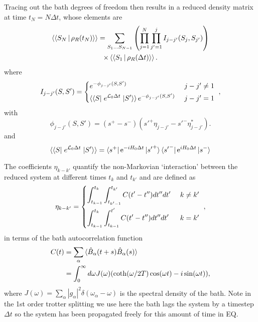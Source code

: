 \documentclass[a4paper, aps, pra,twocolumn]{revtex4-1}
\newcommand{\dket}[1]{\left.\Ket{#1}\right\rangle}
\newcommand{\dbra}[1]{\left\langle\Bra{#1}\right.}
\newcommand{\dbraket}[1]{\left\langle\Braket{#1}\right\rangle}
\begin{document}
Tracing out the bath degrees of freedom then results in a reduced density matrix at time $t_N=N\Delta t$, whose elements are 
\begin{multline}
\label{discreteevo}
\dbraket{S_N|\rho_R(t_N)}=\sum_{S_1 \ldots S_{N-1}}\left(\prod_{j=1}^N \prod_{j'=1}^j I_{j-j'}(S_j,S_{j'})\right)\\
\times \dbraket{S_1 |\rho_R(\Delta t)} .
\end{multline}
where
\begin{equation}
I_{j-j'}(S,S') = \begin{dcases*}
e^{- \phi_{j-j'}(S,S')} &\text{ $j-j'\ne 1$}\\ 
\dbra{S}e^{\mathcal{L}_0 \Delta t}\dket{S'}e^{- \phi_{j-j'}(S,S')} &\text{ $j-j'=1$}
\end{dcases*},
\end{equation}
with
\begin{equation}
 \phi_{j-j'}(S,S')=(s^+-s^-)({s'}^+\eta_{j-j'}-{s'}^-\eta_{j-j'}^*).
\end{equation}
and 
\begin{equation}
\dbra{S}e^{\mathcal{L}_0 \Delta t}\dket{S'}= \bra{s^+}\text{e}^{-iH_0 \Delta t}\ket{{s'}^+}\bra{{s'}^-}\text{e}^{iH_0 \Delta t}\ket{s^-}
\end{equation}


The coefficients $\eta_{k-k'}$ quantify the non-Markovian `interaction' between the reduced system at different times $t_k$ and $t_{k'}$ and are defined as
\begin{equation}
\eta_{k-k'} = \begin{dcases*}
\int_{t_{k-1}}^{t_k}\int_{t_{k'-1}}^{t_{k'}}C(t'-t'')dt''dt' &\text{ $k\ne k'$}\\ 
\int_{t_{k-1}}^{t_k}\int_{t_{k-1}}^{t'}C(t'-t'')dt''dt' &\text{ $k=k'$}
\end{dcases*},
\end{equation}
in terms of the bath autocorrelation function 
\begin{align}\label{bathcorr}
C(t)&=\sum_\alpha \braket{\hat{B}_\alpha(t+s)\hat{B}_\alpha(s)}\\
&=\int_0^\infty d\omega J(\omega)(\coth( \omega/2 T)\cos(\omega t)-i \sin(\omega t)),
\end{align}
where $J(\omega)=\sum_\alpha |g_\alpha|^2 \delta(\omega_\alpha-\omega)$ is the spectral density of the bath.
Note in the 1st order trotter splitting we use here the bath lags the system by a timestep $\Delta t$ so the system has been propagated freely for this amount of time in EQ.
\end{document}
